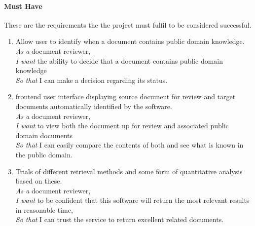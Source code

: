 \documentclass{l4proj}
\begin{document}
\paragraph{Must Have}
These are the requirements the the project must fulfil to be considered successful.
\begin{enumerate}[label=\textbf{M.\arabic*}]
\item Allow user to identify when a document contains public domain knowledge. \\
\textit{As a} document reviewer, \\
\textit{I want} the ability to decide that a document contains public domain knowledge \\
\textit{So that} I can make a decision regarding its status. \\
\item frontend user interface displaying source document for review and target documents automatically identified by the software. \\
\textit{As a} document reviewer, \\
\textit{I want} to view both the document up for review and associated public domain documents \\
\textit{So that} I can easily compare the contents of both and see what is known in the public domain.
\item Trials of different retrieval methods and some form of quantitative analysis based on these. \\
\textit{As a} document reviewer, \\
\textit{I want} to be confident that this software will return the most relevant results in reasonable time, \\
\textit{So that} I can trust the service to return excellent related documents.
\end{enumerate}
\end{document}
